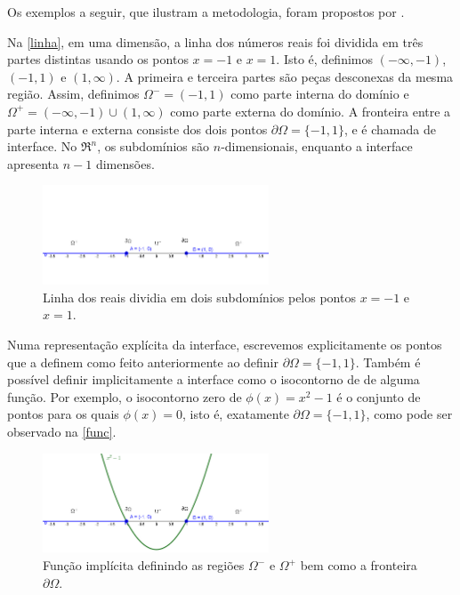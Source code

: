 Os exemplos a seguir, que ilustram a metodologia, foram propostos por .

Na \autoref{linha}, em uma dimensão, a linha dos números reais foi dividida em três partes distintas usando os pontos $x=-1$ e $x=1$. Isto é, definimos $(-\infty,-1)$, $(-1,1)$ e $(1,\infty)$. A primeira e terceira partes são peças desconexas da mesma região. Assim, definimos $\Omega^-=(-1,1)$ como parte interna do domínio e $\Omega^+=(-\infty,-1)\cup(1,\infty)$ como parte externa do domínio. A fronteira entre a parte interna e externa consiste dos dois pontos $\partial\Omega=\{-1,1\}$, e é chamada de interface. No $\Re^n$, os subdomínios são $n$-dimensionais, enquanto a interface apresenta $n-1$ dimensões.

\begin{figure}[!htb]
	\caption{\label{linha}Linha dos reais dividia em dois subdomínios pelos pontos $x=-1$ e $x=1$.}
	\begin{center}
		\includegraphics[width=0.6\textwidth]{revisao_bibliografica/linha}
	\end{center}
\end{figure}

Numa representação explícita da interface, escrevemos explicitamente os pontos que a definem como feito anteriormente ao definir $\partial\Omega=\{-1,1\}$. Também é possível definir implicitamente a interface como o isocontorno de de alguma função. Por exemplo, o isocontorno zero de $\phi(x)=x^2-1$ é o conjunto de pontos para os quais $\phi(x)=0$, isto é, exatamente $\partial\Omega=\{-1,1\}$, como pode ser observado na \autoref{func}. 

\begin{figure}[!htb]
	\caption{\label{func}Função implícita definindo as regiões $\Omega^-$ e $\Omega^+$ bem como a fronteira $\partial\Omega$.}
	\begin{center}
		\includegraphics[width=0.6\textwidth]{revisao_bibliografica/funcao}
	\end{center}
\end{figure}

